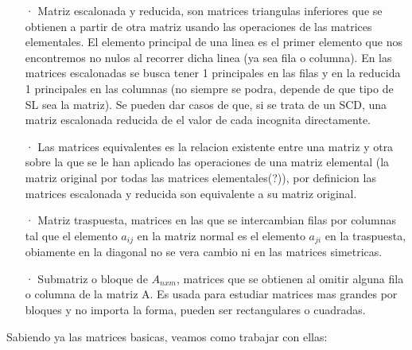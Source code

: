 \documentclass[11pt,a4paper]{article}
\begin{document}
\begin{enumerate}
\item[·]Matriz escalonada y reducida, son matrices triangulas inferiores que se obtienen a partir de otra matriz usando las operaciones de las matrices elementales. El elemento principal de una linea es el primer elemento que nos encontremos no nulos al recorrer dicha linea (ya sea fila o columna). En las matrices escalonadas se busca tener 1 principales en las filas y en la reducida 1 principales en las columnas (no siempre se podra, depende de que tipo de SL sea la matriz). Se pueden dar casos de que, si se trata de un SCD, una matriz escalonada reducida de el valor de cada incognita directamente.

\item[·] Las matrices equivalentes es la relacion existente entre una matriz y otra sobre la que se le han aplicado las operaciones de una matriz elemental (la matriz original por todas las matrices elementales(?)), por definicion las matrices escalonada y reducida son equivalente a su matriz original.

\item[·]Matriz traspuesta, matrices en las que se intercambian filas por columnas tal que el elemento $a_{ij}$ en la matriz normal es el elemento $a_{ji}$ en la traspuesta, obiamente en la diagonal no se vera cambio ni en las matrices simetricas.

\item[·]Submatriz o bloque de $A_{nxm}$, matrices que se obtienen al omitir alguna fila o columna de la matriz A. Es usada para estudiar matrices mas grandes por bloques y no importa la forma, pueden ser rectangulares o cuadradas. 

\end{enumerate}

Sabiendo ya las matrices basicas, veamos como trabajar con ellas:
\end{document}
